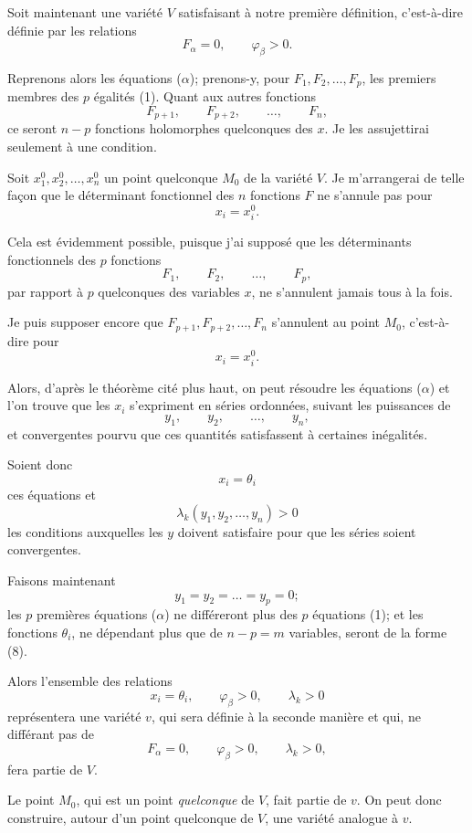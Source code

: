 \documentclass{article}
\begin{document}
Soit maintenant une variété $V$ satisfaisant à notre première définition, c'est-à-dire définie par les relations
\[
F_{\alpha} = 0, \qquad \varphi_{\beta} > 0.
\tag{1}
\]

Reprenons alors les équations ($\alpha$); prenons-y, pour $F_{1}, F_{2}, \ldots, F_{p}$, les premiers membres des $p$ égalités (1). Quant aux autres fonctions
\[
F_{p+1}, \qquad F_{p+2}, \qquad \ldots, \qquad F_{n},
\]
ce seront $n - p$ fonctions holomorphes quelconques des $x$. Je les assujettirai seulement à une condition.

Soit $x^{0}_{1}, x^{0}_{2}, \ldots, x^{0}_{n}$ un point quelconque $M_{0}$ de la variété $V$. Je m'arrangerai de telle façon que le déterminant fonctionnel des $n$ fonctions $F$ ne s'annule pas pour
\[
x_{i} = x^{0}_{i}.
\]

Cela est évidemment possible, puisque j'ai supposé que les déterminants fonctionnels des $p$ fonctions
\[
F_{1}, \qquad F_{2}, \qquad \ldots, \qquad F_{p},
\]
par rapport à $p$ quelconques des variables $x$, ne s'annulent jamais tous à la fois.

Je puis supposer encore que $F_{p+1}, F_{p+2}, \ldots, F_{n}$ s'annulent au point $M_{0}$, c'est-à-dire pour
\[
x_{i} = x^{0}_{i}.
\]

Alors, d'après le théorème cité plus haut, on peut résoudre les équations ($\alpha$) et l'on trouve que les $x_{i}$ s'expriment en séries ordonnées, suivant les puissances de
\[
y_{1}, \qquad y_{2}, \qquad \ldots, \qquad y_{n},
\]
et convergentes pourvu que ces quantités satisfassent à certaines inégalités.

Soient donc
\[
x_{i} = \theta_{i}
\tag{$\beta$}
\]
ces équations et
\[
\lambda_{k}(y_{1}, y_{2}, \ldots, y_{n}) > 0
\]
les conditions auxquelles les $y$ doivent satisfaire pour que les séries soient convergentes.

Faisons maintenant
\[
y_{1} = y_{2} = \ldots = y_{p} = 0;
\]
les $p$ premières équations ($\alpha$) ne différeront plus des $p$ équations (1); et les fonctions $\theta_{i}$, ne dépendant plus que de $n - p = m$ variables, seront de la forme (8).

Alors l'ensemble des relations
\[
x_{i} = \theta_{i}, \qquad \varphi_{\beta} > 0, \qquad \lambda_{k} > 0
\]
représentera une variété $v$, qui sera définie à la seconde manière et qui, ne différant pas de
\[
F_{\alpha} = 0, \qquad \varphi_{\beta} > 0, \qquad \lambda_{k} > 0,
\]
fera partie de $V$.

Le point $M_{0}$, qui est un point \emph{quelconque} de $V$, fait partie de $v$. On peut donc construire, autour d'un point quelconque de $V$, une variété analogue à $v$.
\end{document}

